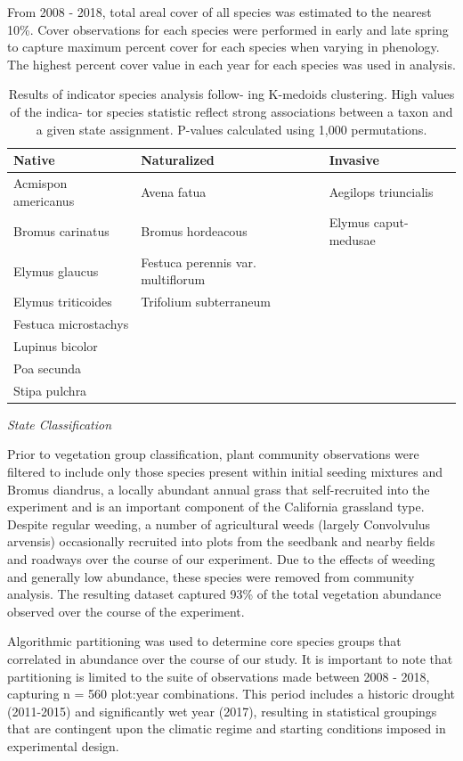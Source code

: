 \documentclass[twoside,12pt,final]{ucthesis-CA2012}
\begin{document}
\begin{ucmainmatter}
From 2008 - 2018, total areal cover of all species was estimated to the nearest 10\%. Cover observations for each species were performed in early and late spring to capture maximum percent cover for each species when varying in phenology. The highest percent cover value in each year for each species was used in analysis.
\begin{table}[ht]
\centering
\begin{tabular}{lll}
  \hline
Native & Naturalized & Invasive \\ 
  \hline
Acmispon americanus & Avena fatua & Aegilops triuncialis \\ 
  Bromus carinatus & Bromus hordeacous & Elymus caput-medusae \\ 
  Elymus glaucus & Festuca perennis var. multiflorum &  \\ 
  Elymus triticoides & Trifolium subterraneum &  \\ 
  Festuca microstachys &  &  \\ 
  Lupinus bicolor &  &  \\ 
  Poa secunda &  &  \\ 
  Stipa pulchra &  &  \\ 
   \hline
\end{tabular}
\caption{Results of indicator species analysis follow-
ing K-medoids clustering. High values of the indica-
tor species statistic reflect strong associations between a
taxon and a given state assignment. P-values calculated
using 1,000 permutations.} 
\end{table}
\emph{State Classification}

Prior to vegetation group classification, plant community observations were filtered to include only those species present within initial seeding mixtures and Bromus diandrus, a locally abundant annual grass that self-recruited into the experiment and is an important component of the California grassland type.
Despite regular weeding, a number of agricultural weeds (largely Convolvulus arvensis) occasionally recruited into plots from the seedbank and nearby fields and roadways over the course of our experiment.
Due to the effects of weeding and generally low abundance, these species were removed from community analysis.
The resulting dataset captured 93\% of the total vegetation abundance observed over the course of the experiment.

Algorithmic partitioning was used to determine core species groups that correlated in abundance over the course of our study.
It is important to note that partitioning is limited to the suite of observations made between 2008 - 2018, capturing n = 560 plot:year combinations.
This period includes a historic drought (2011-2015) and significantly wet year (2017), resulting in statistical groupings that are contingent upon the climatic regime and starting conditions imposed in experimental design.


\end{ucmainmatter}
\end{document}

